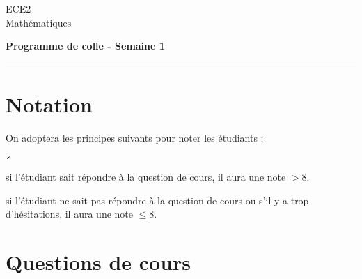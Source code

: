 \documentclass[11pt]{article}%
\begin{document}
\begin{flushleft}
ECE2 \\
Mathématiques
\end{flushleft}


\vspace{0.1cm}

\begin{center}
\textbf{\Large{Programme de colle - Semaine 1}}
\end{center}

\hrule

\vspace*{0,2cm}

\section*{Notation}

On adoptera les principes suivants pour noter les étudiants :
\begin{noliste}{$\scriptstyle \times$}
\item si l'étudiant sait répondre à la question de cours, il 
aura une note $> 8$.
\item si l'étudiant ne sait pas répondre à la question de 
cours ou s'il y a trop d'hésitations, il aura une note $\leq 8$.
\end{noliste}

\section*{Questions de cours}
\end{document}
